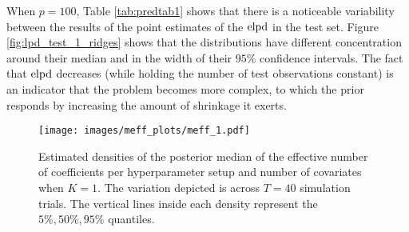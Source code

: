 When $p=100$, Table \ref{tab:predtab1} shows that there is a noticeable variability between the results of the point estimates of the $\text{elpd}$ in the test set. Figure \ref{fig:lpd_test_1_ridges} shows that the distributions have different concentration around their median and in the width of their $95\%$ confidence intervals. The fact that $\text{elpd}$ decreases (while holding the number of test observations constant) is an indicator that the problem becomes more complex, to which the prior responds by increasing the amount of shrinkage it exerts.

 \begin{figure}[t!]%
	\centering
	\texttt{[image: images/meff\_plots/meff\_1.pdf]}
	\caption{Estimated densities of the posterior median of the effective number of coefficients per hyperparameter setup and number of covariates when $K=1$. The variation depicted is across $T=40$ simulation trials. The vertical lines inside each density represent the $5\%, 50\%, 95\%$ quantiles.}
	\label{fig:post_meff_1}
\end{figure}

